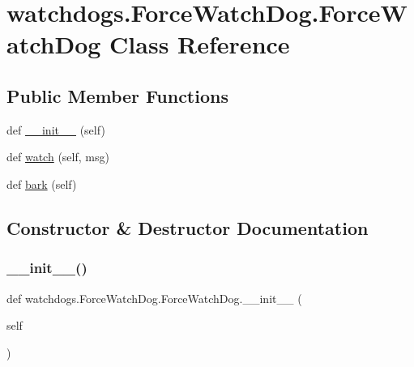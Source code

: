 \hypertarget{classwatchdogs_1_1ForceWatchDog_1_1ForceWatchDog}{}\section{watchdogs.\+Force\+Watch\+Dog.\+Force\+Watch\+Dog Class Reference}
\label{classwatchdogs_1_1ForceWatchDog_1_1ForceWatchDog}
\subsection*{Public Member Functions}
\begin{DoxyCompactItemize}
\item 
def \hyperlink{classwatchdogs_1_1ForceWatchDog_1_1ForceWatchDog_a1865231c73392493ded6f499df259b78}{\+\_\+\+\_\+init\+\_\+\+\_\+} (self)
\item 
def \hyperlink{classwatchdogs_1_1ForceWatchDog_1_1ForceWatchDog_a4514769fd8ee8398c7842a5dc3ddf463}{watch} (self, msg)
\item 
def \hyperlink{classwatchdogs_1_1ForceWatchDog_1_1ForceWatchDog_ae72127f0144c208bcc8b905178a61afc}{bark} (self)
\end{DoxyCompactItemize}


\subsection{Constructor \& Destructor Documentation}
\mbox{\label{classwatchdogs_1_1ForceWatchDog_1_1ForceWatchDog_a1865231c73392493ded6f499df259b78}} 
\subsubsection{\texorpdfstring{\+\_\+\+\_\+init\+\_\+\+\_\+()}{\_\_init\_\_()}}
{\footnotesize\ttfamily def watchdogs.\+Force\+Watch\+Dog.\+Force\+Watch\+Dog.\+\_\+\+\_\+init\+\_\+\+\_\+ (\begin{DoxyParamCaption}\item[{}]{self }\end{DoxyParamCaption})}

